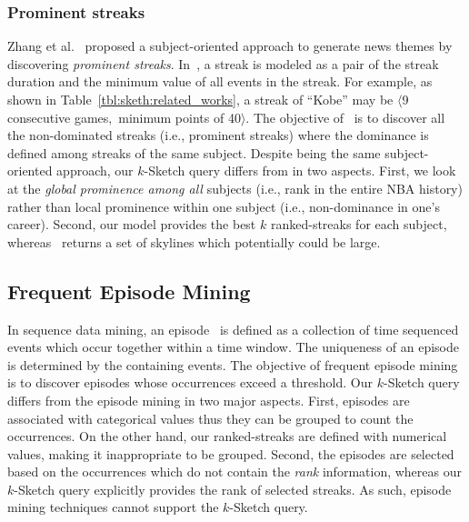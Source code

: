 \subsubsection{Prominent streaks}
Zhang et al.~\cite{zhang2014discovering} proposed a
subject-oriented approach to generate news themes by discovering \emph{prominent streaks}. 
In~\cite{zhang2014discovering}, a streak is modeled as a pair of the streak duration and the minimum
value of all events in the streak.
For example, as shown in Table~\ref{tbl:sketh:related_works}, a streak of ``Kobe'' may be $\langle$9 consecutive games$,$ minimum points of 40$\rangle$.
The objective of~\cite{zhang2014discovering}
is to discover all the non-dominated streaks (i.e., prominent streaks) where the dominance is defined among streaks of the same subject. 
Despite being the same subject-oriented approach,
our $k$-Sketch query differs from \cite{zhang2014discovering} in two aspects. First, we look at the \emph{global prominence among all} subjects (i.e., rank in the entire NBA history) rather than local prominence within one subject (i.e., non-dominance in one's career). 
Second, our model provides the best $k$ ranked-streaks
for each subject, whereas~\cite{zhang2014discovering} returns a set of skylines 
which  potentially could be  large.

 
\subsection{Frequent Episode Mining}
In sequence data mining, an episode~\cite{mannila1997discepisodes,
zhou2010serialepisodes, tatti2012strictepisodes, laxman2007nonoverlapepisodes} is 
defined as a collection of time sequenced events which occur together within a time window. The uniqueness of an episode is determined by the containing events. The objective of frequent episode mining is to discover episodes whose 
occurrences exceed a threshold.  
Our $k$-Sketch query differs from the episode mining in two major aspects. 
First, episodes are associated with categorical values thus they can be grouped to count the occurrences. 
On the other hand, our ranked-streaks are defined with numerical values, making it inappropriate to be grouped.
Second, the episodes are selected based on the occurrences 
which do not contain the \emph{rank} information, whereas our 
$k$-Sketch query explicitly provides the rank of selected streaks.  
As such, episode mining techniques cannot support the $k$-Sketch query.

